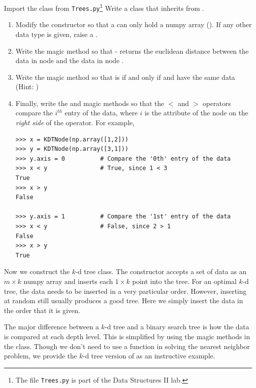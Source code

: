 \begin{problem}
Import the  class from \texttt{Trees.py}\footnote{The file \texttt{Trees.py} is part of the Data Structures II lab.}
Write a  class that inherits from .
\begin{enumerate}
\item Modify the constructor so that a  can only hold a numpy array ().
If any other data type is given, raise a .
\item Write the  magic method so that  -  returns the euclidean distance between the data in node  and the data in node .

\item Write the  magic method so that  is  if and only if  and  have the same data (Hint: )

\item Finally, write the  and  magic methods so that the $<$ and $>$ operators compare the $i^{th}$ entry of the data, where $i$ is the  attribute of the node on the \emph{right side} of the operator.
For example,

\begin{lstlisting}
>>> x = KDTNode(np.array([1,2]))
>>> y = KDTNode(np.array([3,1]))
>>> y.axis = 0			# Compare the '0th' entry of the data 
>>> x < y				# True, since 1 < 3
True
>>> x > y
False

>>> y.axis = 1			# Compare the '1st' entry of the data
>>> x < y				# False, since 2 > 1
False
>>> x > y
True
\end{lstlisting}
\end{enumerate}
\end{problem}

Now we construct the $k$-d tree class.
The constructor accepts a set of data as an $m \times k$ numpy array and inserts each $1 \times k$ point into the tree.
For an optimal $k$-d tree, the data needs to be inserted in a very particular order.
However, inserting at random still usually produces a good tree.
Here we simply insert the data in the order that it is given.

The major difference between a $k$-d tree and a binary search tree is how the data is compared at each depth level.
This is simplified by using the magic methods in the  class.
Though we don't need to use a  function in solving the nearest neighbor problem, we provide the $k$-d tree version of  as an instructive example.

